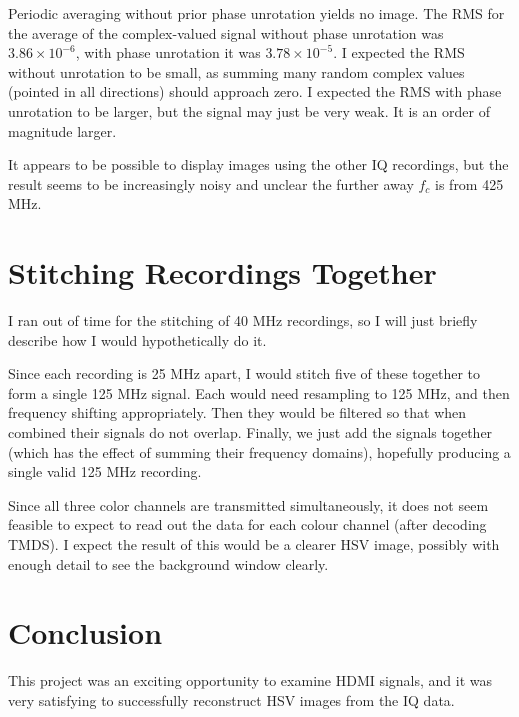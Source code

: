 \documentclass{article}
\begin{document}
Periodic averaging without prior phase unrotation yields no image. The RMS for the average of the complex-valued signal without phase unrotation was $3.86 \times 10^{-6}$, with phase unrotation it was $3.78 \times 10^{-5}$. I expected the RMS without unrotation to be small, as summing many random complex values (pointed in all directions) should approach zero. I expected the RMS with phase unrotation to be larger, but the signal may just be very weak. It is an order of magnitude larger.

It appears to be possible to display images using the other IQ recordings, but the result seems to be increasingly noisy and unclear the further away $f_c$ is from 425 MHz.

\section*{Stitching Recordings Together}
I ran out of time for the stitching of 40 MHz recordings, so I will just briefly describe how I would hypothetically do it.

Since each recording is 25 MHz apart, I would stitch five of these together to form a single 125 MHz signal. Each would need resampling to 125 MHz, and then frequency shifting appropriately. Then they would be filtered so that when combined their signals do not overlap. Finally, we just add the signals together (which has the effect of summing their frequency domains), hopefully producing a single valid 125 MHz recording.

Since all three color channels are transmitted simultaneously, it does not seem feasible to expect to read out the data for each colour channel (after decoding TMDS). I expect the result of this would be a clearer HSV image, possibly with enough detail to see the background window clearly.

\section*{Conclusion}

This project was an exciting opportunity to examine HDMI signals, and it was very satisfying to successfully reconstruct HSV images from the IQ data.

\newpage
\appendix

\newpage


\end{document}
